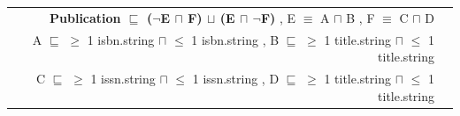 \documentclass[a4paper,fontsize=11pt]{scrartcl}
\newenvironment{DL}{
  \vspace{0cm}
	\begin{center}
  \begin{tabular}{r l}

}{
  \end{tabular}
	\end{center}
}
\begin{document}

\begin{DL}
\textbf{Publication $\sqsubseteq$ ($\neg$E $\sqcap$ F) $\sqcup$ (E $\sqcap$ $\neg$F)} , E $\equiv$ A $\sqcap$ B , F $\equiv$ C $\sqcap$ D \\
A $\sqsubseteq$ $\geq$ 1 isbn.string $\sqcap$ $\leq$ 1 isbn.string , B $\sqsubseteq$ $\geq$ 1 title.string $\sqcap$ $\leq$ 1 title.string \\
C $\sqsubseteq$ $\geq$ 1 issn.string $\sqcap$ $\leq$ 1 issn.string , D $\sqsubseteq$ $\geq$ 1 title.string $\sqcap$ $\leq$ 1 title.string \\
\end{DL}
\end{document}
